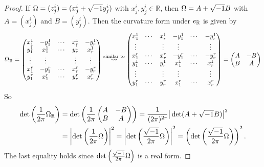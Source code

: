 \begin{proof}
    If $\Omega = (z^i_j) = (x^i_j + \sqrt{-1} y^i_j)$ with $x^i_j,y^i_j\in\mathbb{R}$, 
    then $\Omega = A + \sqrt{-1} B$ with $A = (x^i_j)$ and $B = (y^i_j)$. 
    Then the curvature form under $e_{\mathbb{R}}$ is given by 
    \begin{equation*}
        \Omega_{\mathbb{R}} = 
        \begin{pmatrix}
            x^1_1 & -y^1_1 & \cdots & x^1_r & -y^1_r \\
            y^1_1 & x^1_1 & \cdots & y^1_r & x^1_r \\
            \vdots & \vdots &       & \vdots & \vdots \\
            x^r_1 & -y^r_1 & \cdots & x^r_r & -y^r_r \\
            y^r_1 & x^r_1 & \cdots & y^r_r & x^r_r
        \end{pmatrix}
        \overset{\text{similar to}}{\rightsquigarrow} 
        \begin{pmatrix}
            x^1_1 & \cdots & x^1_r & -y^1_1 & \cdots & -y^1_r \\ 
            \vdots & & \vdots & \vdots & & \vdots \\ 
            x^r_1 & \cdots & x^r_r & -y^r_1 & \cdots & -y^r_r \\ 
            y^1_1 & \cdots & y^1_r & x^1_1 & \cdots & x^1_r \\ 
            \vdots & & \vdots & \vdots & & \vdots \\ 
            y^r_1 & \cdots & y^r_r & x^r_1 & \cdots & x^r_r 
        \end{pmatrix} 
        = 
        \begin{pmatrix}
            A & -B \\
            B & A
        \end{pmatrix}
    \end{equation*}
    So
    \begin{align*}
        \det\left(\frac{1}{2\pi}\Omega_{\mathbb{R}}\right) 
        &= \det\left(\frac{1}{2\pi}\begin{pmatrix} A & -B \\ B & A \end{pmatrix}\right) 
        = \frac{1}{(2\pi)^{2r}}\big|\det(A+\sqrt{-1} B)\big|^2 \\
        &= \left|\det\left(\frac{1}{2\pi}\Omega\right)\right|^2 
        = \left|\det\left(\frac{\sqrt{-1}}{2\pi}\Omega\right)\right|^2 
        = \left(\det\left(\frac{\sqrt{-1}}{2\pi}\Omega\right)\right)^2.
    \end{align*}
    The last equality holds since $\det\left(\frac{\sqrt{-1}}{2\pi}\Omega\right)$ is a real form. 

\end{proof}
